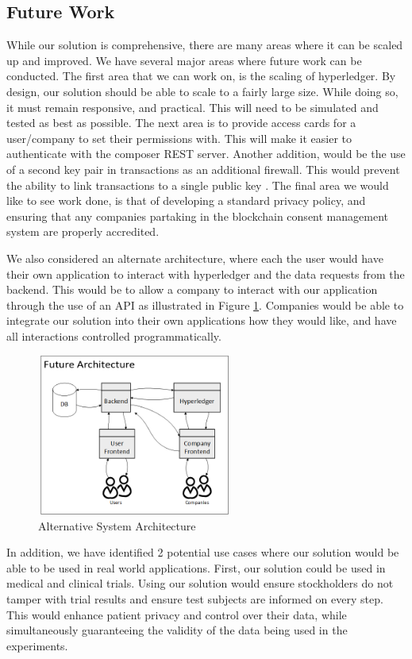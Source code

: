 \documentclass[11pt,journal]{IEEEtran}
\begin{document}
\subsection{Future Work}
While our solution is comprehensive, there are many areas where it can be scaled up and improved. We have several major areas where future work can be conducted.  The first area that we can work on, is the scaling of hyperledger.  By design, our solution should be able to scale to a fairly large size.  While doing so, it must remain responsive, and practical.  This will need to be simulated and tested as best as possible.  The next area is to provide access cards for a user/company to set their permissions with.  This will make it easier to authenticate with the composer REST server.  Another addition, would be the use of a second key pair in transactions as an additional firewall.  This would prevent the ability to link transactions to a single public key \cite{nakamoto2008bitcoin}.  The final area we would like to see work done, is that of developing a standard privacy policy, and ensuring that any companies partaking in the blockchain consent management system are properly accredited.

We also considered an alternate architecture, where each the user would have their own application to interact with hyperledger and the data requests from the backend.  This would be to allow a company to interact with our application through the use of an API as illustrated in Figure \ref{fig:FutureArch}.  Companies would be able to integrate our solution into their own applications how they would like, and have all interactions controlled programmatically.

\begin{figure}
  \centering
  \includegraphics[width=2.5in]{future_arch}
  \caption{Alternative System Architecture}
  \label{fig:FutureArch}
\end{figure}

In addition, we have identified 2 potential use cases where our solution would be able to be used in real world applications. First, our solution could be used in medical and clinical trials. Using our solution would ensure stockholders do not tamper with trial results and ensure test subjects are informed on every step. This would enhance patient privacy and control over their data, while simultaneously guaranteeing the validity of the data being used in the experiments.
\end{document}
